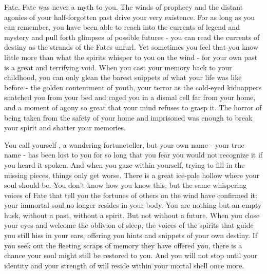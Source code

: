 \documentclass[char]{Kos}
\begin{document}
\name{\cFugitive{}}

Fate. Fate was never a myth to you. The winds of prophecy and the distant agonies of your half-forgotten past drive your very existence. For as long as you can remember, you have been able to reach into the currents of legend and mystery and pull forth glimpses of possible futures - you can read the currents of destiny as the strands of the Fates unfurl. Yet sometimes you feel that you know little more than what the spirits whisper to you on the wind - for your own past is a great and terrifying void. When you cast your memory back to your childhood, you can only glean the barest snippets of what your life was like before - the golden contentment of youth, your terror as the cold-eyed kidnappers snatched you from your bed and caged you in a dismal cell far from your home, and a moment of agony so great that your mind refuses to grasp it. The horror of being taken from the safety of your home and imprisoned was enough to break your spirit and shatter your memories. 

You call yourself \cFugitive{}, a wandering fortuneteller, but your own name - your true name - has been lost to you for so long that you fear you would not recognize it if you heard it spoken. And when you gaze within yourself, trying to fill in the missing pieces, things only get worse. There is a great ice-pale hollow where your soul should be. You don't know how you know this, but the same whispering voices of Fate that tell you the fortunes of others on the wind have confirmed it: your immortal soul no longer resides in your body. You are nothing but an empty husk, without a past, without a spirit. But not without a future. When you close your eyes and welcome the oblivion of sleep, the voices of the spirits that guide you still hiss in your ears, offering you hints and snippets of your own destiny. If you seek out the fleeting scraps of memory they have offered you, there is a chance your soul might still be restored to you. And you will not stop until your identity and your strength of will reside within your mortal shell once more.
\end{document}
